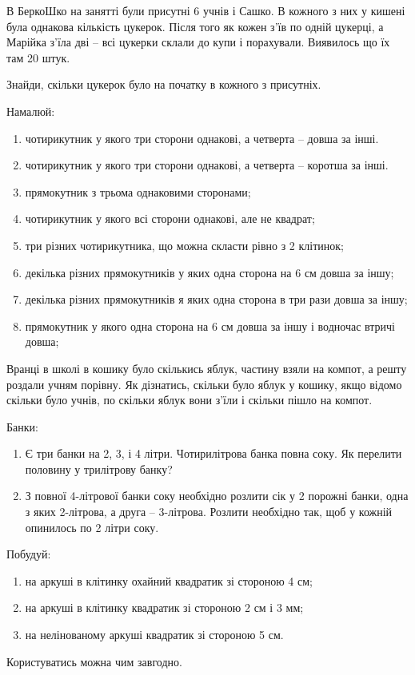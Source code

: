 \problem
В БеркоШко на занятті були присутні 6 учнів і Сашко.
В кожного з них у кишені була однакова кількість цукерок.
Після того як кожен з'їв по одній цукерці,
а Марійка з'їла дві – всі цукерки склали до купи і порахували.
Виявилось що їх там 20 штук.

Знайди, скільки цукерок було на початку в кожного з присутніх.


\problem
Намалюй:
\begin{enumerate}
    \item чотирикутник у якого три сторони однакові,
    а четверта – довша за інші.
    \item чотирикутник у якого три сторони однакові,
    а четверта – коротша за інші.
    \item прямокутник з трьома однаковими сторонами;
    \item чотирикутник у якого всі сторони однакові, але не квадрат;
    \item три різних чотирикутника, що можна скласти рівно з 2 клітинок;
    \item декілька різних прямокутників у яких одна сторона
    на 6 см довша за іншу;
    \item декілька різних прямокутників я яких одна сторона
    в три рази довша за іншу;
    \item прямокутник у якого одна сторона на 6 см довша за іншу
    і водночас втричі довша;
\end{enumerate}


\problem
Вранці в школі в кошику було скількись яблук, частину взяли на компот,
а решту роздали учням порівну.
Як дізнатись, скільки було яблук у кошику, якщо відомо скільки було учнів,
по скільки яблук вони з'їли і скільки пішло на компот.


\problem
Банки:
\begin{enumerate}
    \item Є три банки на 2, 3, і 4 літри. Чотирилітрова банка повна соку.
    Як перелити половину у трилітрову банку?
    \item З повної 4-літрової банки соку необхідно розлити сік 
    у 2 порожні банки, одна з яких 2-літрова, а друга – 3-літрова.
    Розлити необхідно так, щоб у кожній опинилось по 2 літри соку.
\end{enumerate}


\problem
Побудуй:
\begin{enumerate}
    \item на аркуші в клітинку охайний квадратик зі стороною 4 см;
    \item на аркуші в клітинку квадратик зі стороною 2 см і 3 мм;
    \item на нелінованому аркуші квадратик зі стороною 5 см.
\end{enumerate}
Користуватись можна чим завгодно.


